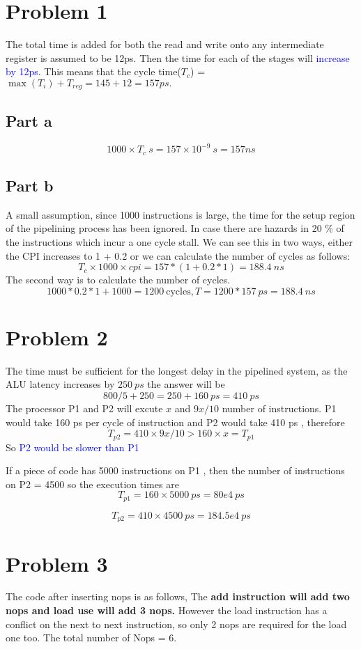 
\section{Problem 1}
The total time is added for both the read and write onto any intermediate register is assumed to be 12ps.
Then the time for each of the stages will \textcolor{blue}{increase by 12ps}.
This means that the cycle time($T_c$) =$\max(T_i) + T_{reg} = 145 + 12 = 157ps.$

\subsection{Part a}

$$
        1000 \times T_c \ s = 157 \times 10^{-9} \ s = 157ns 
$$

\subsection{Part b}
A small assumption, since 1000 instructions is large, the time for the setup region of the pipelining process has been ignored.
In case there are hazards in 20 \% of the instructions which incur a one cycle stall.
We can see this in two ways, either the CPI increases to 1 + 0.2 or we can calculate the number of cycles as follows:
$$
 T_c \times 1000 \times  cpi  = 157 * ( 1 + 0.2 * 1 ) = 188.4 \ ns
$$
The second way is to calculate the number of cycles.
$$
 1000 * 0.2 * 1  + 1000 = 1200  \ \text{cycles}, 
 T = 1200 * 157 \ ps = 188.4 \ ns
$$

\section{Problem 2}
The time must be sufficient for the longest delay in the pipelined system, as the ALU latency increases by $250 \ ps$
the answer will be 
$$
800/5  + 250 = 250 + 160 \ ps = 410 \ ps
$$
The processor P1 and P2 will excute $x$ and $9x/10$ number of instructions.
P1 would take 160 ps per cycle of instruction and P2 would take 410 ps , therefore
$$
T_{p2} = 410 \times  9x/10  > 160 \times x =  T_{p1}
$$ 
So \textcolor{blue}{P2 would be slower than P1}

If a piece of code has 5000 instructions on P1 , then the number of instructions on P2 = 4500
so the execution times are 
\\
$$
T_{p1} = 160 \times 5000 \ ps = 80 e4 \ ps 
$$

$$
T_{p2} = 410 \times 4500 \ ps = 184.5 e4 \ ps
$$
\section{Problem 3}
The code after inserting nops is as follows, The \textbf{ add instruction will add two nops and load use will add 3 nops.}
However the load instruction has a conflict on the next to next instruction, so only 2 nops are required for the load one too.
The total number of Nops = 6.

